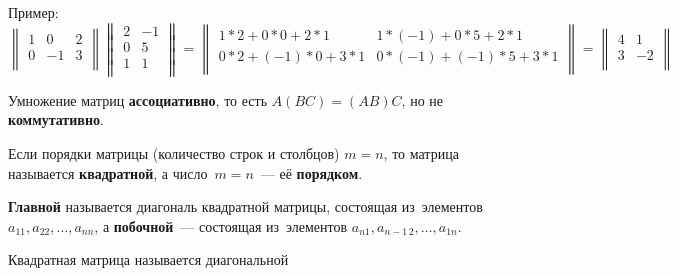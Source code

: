 Пример:
$$
\begin{Vmatrix}
	1 & 0 & 2 \\ 
	0 & -1 & 3 \\ 
\end{Vmatrix} 
\begin{Vmatrix}
2 & -1 \\ 
0 & 5 \\ 
1 & 1 \\ 
\end{Vmatrix} = 
\begin{Vmatrix}
1*2 + 0 * 0 + 2 * 1 & 1 * (-1) + 0 * 5 + 2 * 1 \\ 
0 * 2 + (-1) * 0 + 3 * 1 & 0 * (-1) + (-1) * 5 + 3 * 1 \\ 
\end{Vmatrix}  =
\begin{Vmatrix}
4 & 1 \\ 
3 & -2 \\ 
\end{Vmatrix}
$$

Умножение матриц \textbf{ассоциативно}, то есть $A(BC) = (AB)C$, но не \textbf{коммутативно}.

Если порядки матрицы (количество строк и столбцов) $m = n$, то матрица называется \textbf{квадратной}, а число~$m = n$~--- её \textbf{порядком}.

\textbf{Главной} называется диагональ квадратной матрицы, состоящая из~элементов $a_{11}, a_{22}, \ldots, a_{nn}$, а \textbf{побочной}~--- состоящая из~элементов $a_{n1}, a_{n-1\, 2}, \ldots, a_{1n}$.

Квадратная матрица называется диагональной